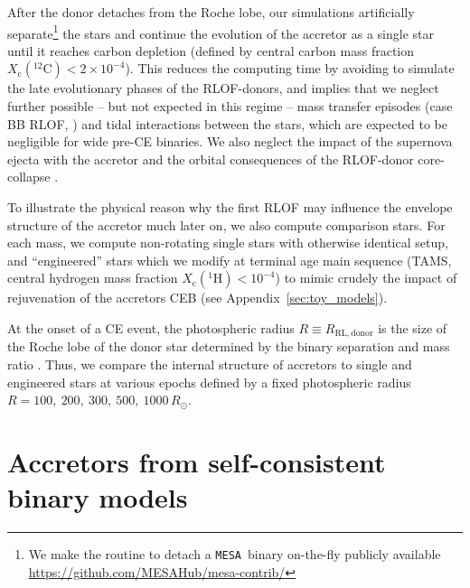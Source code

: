\documentclass[twocolumn,twocolappendix,trackchanges]{aastex63}
\newcommand{\code}[1]{\texttt{#1}}
\newcommand{\mesa}{\code{MESA}}
\begin{document}
After the  donor detaches from the Roche lobe, our
simulations artificially  separate\footnote{We make
  the routine to detach a \mesa\ binary on-the-fly publicly available
  \url{https://github.com/MESAHub/mesa-contrib/}} the stars and
continue the evolution of the accretor as a single star until it
reaches carbon depletion (defined by central carbon mass fraction
$X_\mathrm{c}(^{12}\mathrm{C})<2\times10^{-4} $). This reduces the
computing time by avoiding to simulate the late evolutionary phases of
the RLOF-donors, and implies that we neglect further possible -- but
not expected in this regime -- mass transfer episodes (case BB RLOF,
\citealt{delgado:81, laplace:2020}) and tidal interactions between the
stars, which are expected to be negligible for wide
  pre-CE binaries. We also neglect the impact of the supernova
ejecta with the accretor \cite[which has a small and
  short-lasting effect only on the outermost layers,
e.g.,][]{hirai:2018, ogata:2021} and the orbital consequences of the
RLOF-donor core-collapse \citep[e.g.,][]{brandt:1995, kalogera:1996,
  tauris:1998, renzo:2019walk}.

To illustrate the physical reason why the first RLOF may influence the
envelope structure of the accretor much later on, we also compute
comparison stars. For each mass, we compute non-rotating single stars
with otherwise identical setup, and ``engineered'' stars which we
modify at terminal age main sequence (TAMS, central hydrogen mass
fraction $X_\mathrm{c}(^1\mathrm{H})<10^{-4}$) to mimic crudely the
impact of rejuvenation of the accretors CEB (see
Appendix~\ref{sec:toy_models}).

At the onset of a CE event, the photospheric radius
$R\equiv R_\mathrm{RL, donor}$ is the size of the Roche lobe of the
donor star determined by the binary separation and mass ratio
\citep[e.g.,][]{paczynski:1971, eggleton:83}. Thus, we compare the
internal structure of accretors to single and engineered stars at
various epochs defined by a fixed photospheric radius
$R=100,\ 200,\ 300,\ 500,\ 1000\,R_\odot$.

\section{Accretors from self-consistent binary models}
\label{sec:bin_models}
\end{document}
